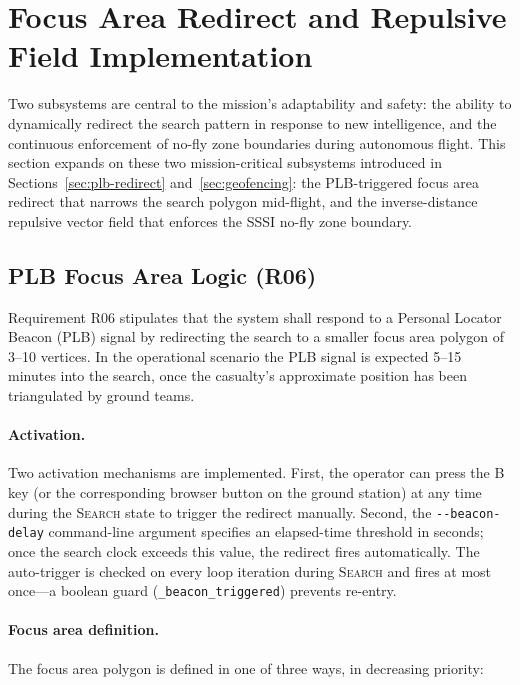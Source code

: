 \section{Focus Area Redirect and Repulsive Field Implementation}\label{sec:focus-repulsive}

Two subsystems are central to the mission's adaptability and safety: the ability to dynamically redirect the search pattern in response to new intelligence, and the continuous enforcement of no-fly zone boundaries during autonomous flight.  This section expands on these two mission-critical subsystems introduced in Sections~\ref{sec:plb-redirect} and~\ref{sec:geofencing}: the PLB-triggered focus area redirect that narrows the search polygon mid-flight, and the inverse-distance repulsive vector field that enforces the SSSI no-fly zone boundary.

\subsection{PLB Focus Area Logic (R06)}\label{sec:plb-redirect-app}

Requirement R06 stipulates that the system shall respond to a Personal Locator Beacon (PLB) signal by redirecting the search to a smaller focus area polygon of 3--10 vertices. In the operational scenario the PLB signal is expected 5--15 minutes into the search, once the casualty's approximate position has been triangulated by ground teams.

\paragraph{Activation.}
Two activation mechanisms are implemented. First, the operator can press the B key (or the corresponding browser button on the ground station) at any time during the \textsc{Search} state to trigger the redirect manually. Second, the \texttt{-{}-beacon-delay} command-line argument specifies an elapsed-time threshold in seconds; once the search clock exceeds this value, the redirect fires automatically. The auto-trigger is checked on every loop iteration during \textsc{Search} and fires at most once---a boolean guard (\texttt{\_beacon\_triggered}) prevents re-entry.

\paragraph{Focus area definition.}
The focus area polygon is defined in one of three ways, in decreasing priority:

